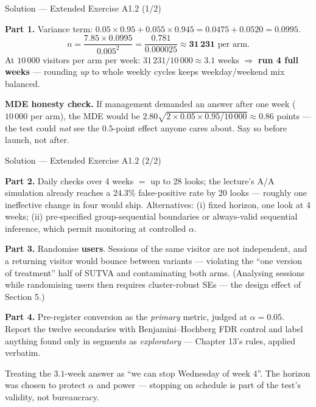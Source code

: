 \documentclass[aspectratio=169,11pt]{beamer}
\begin{document}
\begin{frame}{Solution --- Extended Exercise A1.2 (1/2)}
\begin{solutionbox}
  \textbf{Part 1.} Variance term:
  $0.05\times0.95 + 0.055\times0.945 = 0.0475 + 0.0520 = 0.0995$.
  \[
    n = \frac{7.85 \times 0.0995}{0.005^2}
      = \frac{0.781}{0.000025} \approx \mathbf{31\,231} \text{ per arm}.
  \]
  At $10\,000$ visitors per arm per week: $31\,231/10\,000 \approx 3.1$ weeks
  $\Rightarrow$ \textbf{run 4 full weeks} --- rounding \emph{up} to whole weekly cycles
  keeps weekday/weekend mix balanced.

  \smallskip
  \textbf{MDE honesty check.} If management demanded an answer after one week
  ($10\,000$ per arm), the MDE would be
  $2.80\sqrt{2 \times 0.05 \times 0.95 / 10\,000} \approx 0.86$ points --- the test
  could \emph{not} see the $0.5$-point effect anyone cares about. Say so before launch,
  not after.
\end{solutionbox}
\end{frame}

\begin{frame}{Solution --- Extended Exercise A1.2 (2/2)}
\begin{solutionbox}
  \textbf{Part 2.} Daily checks over 4 weeks $=$ up to $28$ looks; the lecture's A/A
  simulation already reaches a $\mathbf{24.3\%}$ false-positive rate by $20$ looks ---
  roughly one ineffective change in four would ship. Alternatives: (i) fixed horizon,
  one look at 4 weeks; (ii) pre-specified group-sequential boundaries or always-valid
  sequential inference, which permit monitoring at controlled $\alpha$.

  \smallskip
  \textbf{Part 3.} Randomise \textbf{users}. Sessions of the same visitor are not
  independent, and a returning visitor would bounce between variants --- violating the
  ``one version of treatment'' half of SUTVA and contaminating both arms. (Analysing
  sessions while randomising users then requires cluster-robust SEs --- the design
  effect of Section 5.)

  \smallskip
  \textbf{Part 4.} Pre-register conversion as the \emph{primary} metric, judged at
  $\alpha=0.05$. Report the twelve secondaries with Benjamini--Hochberg FDR control and
  label anything found only in segments as \emph{exploratory} --- Chapter 13's rules,
  applied verbatim.
\end{solutionbox}
\begin{mistake}
  Treating the $3.1$-week answer as ``we can stop Wednesday of week 4''. The horizon
  was chosen to protect $\alpha$ and power --- stopping on schedule is part of the
  test's validity, not bureaucracy.
\end{mistake}
\end{frame}
\end{document}
